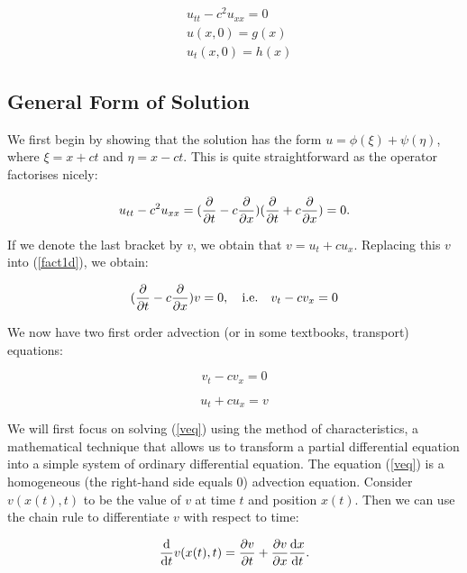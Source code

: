 \documentclass[a4paper, 12pt]{article}
\numberwithin{equation}{section}
\begin{document}
\begin{equation} \label{ivp1d}
    \begin{aligned}
    &u_{tt}-c^2u_{xx}=0\\
    &u(x,0)=g(x)\\
    &u_t(x,0)=h(x)
    \end{aligned}
\end{equation}

\subsection{General Form of Solution}

We first begin by showing that the solution has the form $u=\phi(\xi)+\psi(\eta)$, where $\xi=x+ct$ and $\eta=x-ct$. This is quite straightforward
as the operator factorises nicely:

\begin{equation} \label{fact1d}
    u_{tt}-c^2u_{xx}=(\diffp[1]{}{t} - c \diffp[1]{}{x})(\diffp[1]{}{t} + c \diffp[1]{}{x})=0.
\end{equation}

If we denote the last bracket by $v$, we obtain that $v=u_t+cu_x$. Replacing this $v$ into (\ref{fact1d}), we obtain:

\begin{equation*} 
    (\diffp[1]{}{t} -c \diffp[1]{}{x})v=0, \quad \textrm{i.e.} \quad v_t-cv_x=0
\end{equation*}

We now have two first order advection (or in some textbooks, transport) equations:

\begin{equation} 
    \label{veq}
    v_t-cv_x=0 
\end{equation}

\begin{equation}
    \label{ueq}
    u_t+cu_x=v 
\end{equation}

We will first focus on solving (\ref{veq}) using the method of characteristics, a mathematical technique that allows us to transform a partial differential
equation into a simple system of ordinary differential equation. \cite{Ev} The equation (\ref{veq}) is a homogeneous (the right-hand side equals $0$) 
advection equation. Consider $v(x(t),t)$ to be the value of $v$ at time $t$ and position $x(t)$. Then we can use the chain rule to differentiate
$v$ with respect to time:

\begin{equation} \label{diffv}
    \diff{}{t}v(x(t),t)=\diffp[1]{v}{t}+\diffp[1]{v}{x}\diff{x}{t}.
\end{equation}
\end{document}
